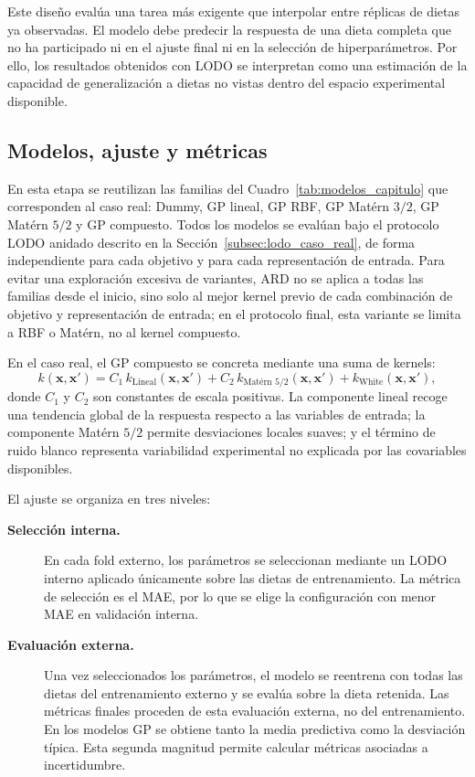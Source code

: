 Este diseño evalúa una tarea más exigente que interpolar entre réplicas de dietas ya observadas. El modelo debe predecir la respuesta de una dieta completa que no ha participado ni en el ajuste final ni en la selección de hiperparámetros. Por ello, los resultados obtenidos con LODO se interpretan como una estimación de la capacidad de generalización a dietas no vistas dentro del espacio experimental disponible.

\subsection{Modelos, ajuste y métricas}\label{subsec:modelos_metricas_caso_real}

En esta etapa se reutilizan las familias del Cuadro~\ref{tab:modelos_capitulo} que corresponden al caso real: Dummy, GP lineal, GP RBF, GP Matérn \(3/2\), GP Matérn \(5/2\) y GP compuesto. Todos los modelos se evalúan bajo el protocolo LODO anidado descrito en la Sección~\ref{subsec:lodo_caso_real}, de forma independiente para cada objetivo y para cada representación de entrada. Para evitar una exploración excesiva de variantes, ARD no se aplica a todas las familias desde el inicio, sino solo al mejor kernel previo de cada combinación de objetivo y representación de entrada; en el protocolo final, esta variante se limita a RBF o Matérn, no al kernel compuesto.

En el caso real, el GP compuesto se concreta mediante una suma de kernels: \[k(\bm{x},\bm{x}')
=
C_1\,k_{\text{Lineal}}(\bm{x},\bm{x}')
+
C_2\,k_{\text{Matérn }5/2}(\bm{x},\bm{x}')
+
k_{\text{White}}(\bm{x},\bm{x}'),\] donde \(C_1\) y \(C_2\) son constantes de escala positivas. La componente lineal recoge una tendencia global de la respuesta respecto a las variables de entrada; la componente Matérn \(5/2\) permite desviaciones locales suaves; y el término de ruido blanco representa variabilidad experimental no explicada por las covariables disponibles.

El ajuste se organiza en tres niveles:

\begin{description}
\item[\textbf{Selección interna.}]
En cada fold externo, los parámetros se seleccionan mediante un LODO interno aplicado únicamente sobre las dietas de entrenamiento. La métrica de selección es el MAE, por lo que se elige la configuración con menor MAE en validación interna.
\item[\textbf{Evaluación externa.}]
Una vez seleccionados los parámetros, el modelo se reentrena con todas las dietas del entrenamiento externo y se evalúa sobre la dieta retenida. Las métricas finales proceden de esta evaluación externa, no del entrenamiento. En los modelos GP se obtiene tanto la media predictiva como la desviación típica. Esta segunda magnitud permite calcular métricas asociadas a incertidumbre.
\end{description}


